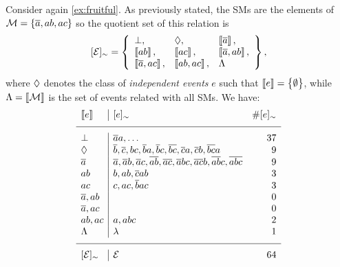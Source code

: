 \documentclass[x11names]{tlp}
\begin{document}
\ifExamples
	\begin{example}\label{ex:classes}\em

		Consider again \cref{ex:fruitful}.
As previously stated, the \aclp{SM} are
		the elements of ${\mathcal{M}} = \set{\ensuremath{\overline{a}}, ab, ac}$ so the quotient set of
		this relation is
		\begin{equation*}
			\class{\EVENTSset} = \set{
				\begin{array}{lll}
					\inconsistent,           &
					\indepclass,             &
					\stablecore{\co{a}},%
					\\
					\stablecore{ab},         &
					\stablecore{ac},         &
					\stablecore{\co{a}, ab},%
					\\
					\stablecore{\co{a}, ac}, &
					\stablecore{ab, ac},     &
					\consequenceclass
				\end{array}
			},
		\end{equation*}
		where $\Diamond$ denotes the class of \emph{independent
			events} $e$ such that $\left\llbracket e \right\rrbracket = \set{\emptyset}$,
		while $\Lambda = \left\llbracket {\mathcal{M}} \right\rrbracket$ is the set of
		events related with all \acp{SM}.
We have:
		\begin{equation*}
			\begin{array}{l|lr}
				\stablecore{e}
				       & \class{e}
				       & \# \class{e}                                                                           %
				\\
				\hline
				\inconsistent
				       & \co{a}a, \ldots
				       & 37                                                                                     %
				\\
				\indepclass
				       & \co{b}, \co{c}, bc, \co{b}a, \co{b}c, \co{bc}, \co{c}a, \co{c}b, \co{bc}a
				       & 9                                                                                      %
				\\
				\co{a}
				       & \co{a}, \co{a}b, \co{a}c, \co{ab}, \co{ac}, \co{a}bc, \co{ac}b, \co{ab}c, \co{abc}
				       & 9                                                                                      %
				\\
				ab     & b, ab, \co{c}ab                                                                    & 3 \\%
				ac     & c, ac, \co{b}ac                                                                    & 3 \\%
				\co{a}, ab
				       &
				       & 0                                                                                      %
				\\
				\co{a}, ac
				       &
				       & 0
				\\
				ab, ac & a, abc                                                                             & 2 \\%
				\consequenceclass
				       & \emptyevent
				       & 1
				\\
				\hline \class{\EVENTSset}
				       & \EVENTSset
				       & 64
			\end{array}
		\end{equation*}


\end{example}
\end{document}
